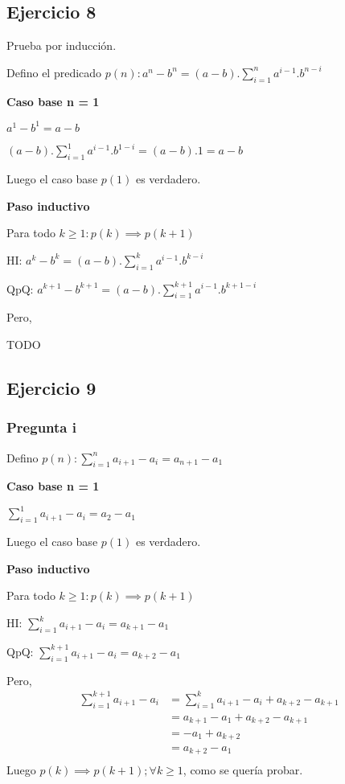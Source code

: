 \subsection{Ejercicio 8}

Prueba por inducción.

Defino el predicado $p(n) : a^n - b^n = (a-b).\sum_{i=1}^{n}a^{i-1}.b^{n-i}$

\textbf{Caso base n = 1}

$ a^1 - b^1 = a-b$

$ (a-b).\sum_{i=1}^{1}a^{i-1}.b^{1-i} = (a-b).1 = a-b$

Luego el caso base $p(1)$ es verdadero.

\textbf{Paso inductivo}

Para todo $k \geq 1: p(k) \implies p(k+1)$

HI: $a^k - b^k = (a-b).\sum_{i=1}^{k}a^{i-1}.b^{k-i}$

QpQ: $a^{k+1} - b^{k+1} = (a-b).\sum_{i=1}^{k+1}a^{i-1}.b^{k+1-i}$

Pero,

TODO
\subsection{Ejercicio 9}

\subsubsection{Pregunta i}

Defino $p(n) : \sum_{i=1}^{n}a_{i+1}-a_i = a_{n+1} - a_1$

\textbf{Caso base n = 1}

$\sum_{i=1}^{1}a_{i+1}-a_i = a_2 - a_1$

Luego el caso base $p(1)$ es verdadero.

\textbf{Paso inductivo}

Para todo $k \geq 1: p(k) \implies p(k+1)$

HI: $\sum_{i=1}^{k}a_{i+1}-a_i = a_{k+1} - a_1$

QpQ: $\sum_{i=1}^{k+1}a_{i+1}-a_i = a_{k+2} - a_1$

Pero,
\begin{align*}
    \sum_{i=1}^{k+1}a_{i+1}-a_i &= \sum_{i=1}^{k}a_{i+1}-a_i + a_{k+2} - a_{k+1} \\
    &= a_{k+1} - a_1 + a_{k+2} - a_{k+1} \\
    &= - a_1 + a_{k+2} \\
    &= a_{k+2} - a_1 \\
\end{align*}
Luego $p(k) \implies p(k+1); \forall k \geq 1$, como se quería probar.

